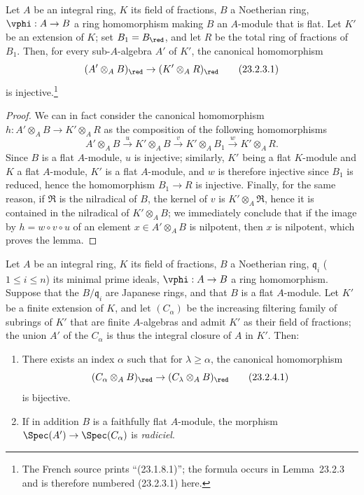 \begin{lemma}[23.2.3]
\label{0.23.2.3}
Let $A$ be an integral ring, $K$ its field of fractions, $B$ a Noetherian ring, $\vphi:A\to B$ a ring homomorphism making $B$ an $A$-module that is flat.
Let $K'$ be an extension of $K$; set $B_1=B_\red$, and let $R$ be the total ring of fractions of $B_1$.
Then, for every sub-$A$-algebra $A'$ of $K'$, the canonical homomorphism
\[
\label{0.23.2.3.1}
  (A'\otimes_A B)_\red\to(K'\otimes_A R)_\red
  \tag{23.2.3.1}
\]
is injective.\footnote{The French source prints ``(23.1.8.1)''; the formula occurs in Lemma~23.2.3 and is therefore numbered (23.2.3.1) here.}
\end{lemma}

\begin{proof}
We can in fact consider the canonical homomorphism $h:A'\otimes_A B\to K'\otimes_A R$ as the composition of the following homomorphisms
\[
  A'\otimes_A B\xrightarrow{u}K'\otimes_A B\xrightarrow{v}K'\otimes_A B_1\xrightarrow{w}K'\otimes_A R.
\]
Since $B$ is a flat $A$-module, $u$ is injective; similarly, $K'$ being a flat $K$-module and $K$ a flat $A$-module, $K'$ is a flat $A$-module, and $w$ is therefore injective since $B_1$ is reduced, hence the homomorphism $B_1\to R$ is injective.
Finally, for the same reason, if $\mathfrak{R}$ is the nilradical of $B$, the kernel of $v$ is $K'\otimes_A\mathfrak{R}$, hence it is contained in the nilradical of $K'\otimes_A B$; we immediately conclude that if the image by $h=w\circ v\circ u$ of an element $x\in A'\otimes_A B$ is nilpotent, then $x$ is nilpotent, which proves the lemma.
\end{proof}

\begin{proposition}[23.2.4]
\label{0.23.2.4}
Let $A$ be an integral ring, $K$ its field of fractions, $B$ a Noetherian ring, $\mathfrak{q}_i$ ($1\leq i\leq n$) its minimal prime ideals, $\vphi:A\to B$ a ring homomorphism.
Suppose that the $B/\mathfrak{q}_i$ are Japanese rings, and that $B$ is a flat $A$-module.
Let $K'$ be a finite extension of $K$, and let $(C_\alpha)$ be the increasing filtering family of subrings of $K'$ that are finite $A$-algebras and admit $K'$ as their field of fractions; the union $A'$ of the $C_\alpha$ is thus the integral closure of $A$ in $K'$.
Then:
\begin{enumerate}
  \item[{\rm(i)}] There exists an index $\alpha$ such that for $\lambda\geq\alpha$, the canonical homomorphism
    \[
    \label{0.23.2.4.1}
      (C_\alpha\otimes_A B)_\red\to(C_\lambda\otimes_A B)_\red
      \tag{23.2.4.1}
    \]
    is bijective.
  \item[{\rm(ii)}] If in addition $B$ is a faithfully flat $A$-module, the morphism $\Spec(A')\to\Spec(C_\alpha)$ is \emph{radiciel}.
\end{enumerate}
\end{proposition}

